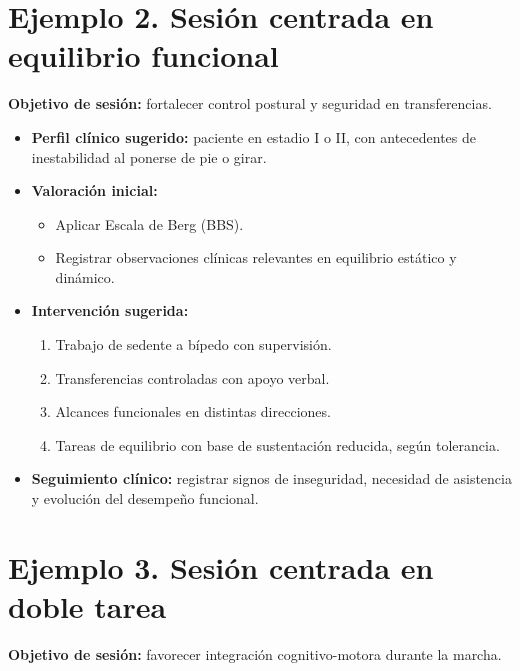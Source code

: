 \documentclass[12pt,a4paper]{article}
\begin{document}
\section{Ejemplo 2. Sesión centrada en equilibrio funcional}

\textbf{Objetivo de sesión:} fortalecer control postural y seguridad en transferencias.

\begin{itemize}
    \item \textbf{Perfil clínico sugerido:} paciente en estadio I o II, con antecedentes de inestabilidad al ponerse de pie o girar.
    \item \textbf{Valoración inicial:}
    \begin{itemize}
        \item Aplicar Escala de Berg (BBS).
        \item Registrar observaciones clínicas relevantes en equilibrio estático y dinámico.
    \end{itemize}
    \item \textbf{Intervención sugerida:}
    \begin{enumerate}
        \item Trabajo de sedente a bípedo con supervisión.
        \item Transferencias controladas con apoyo verbal.
        \item Alcances funcionales en distintas direcciones.
        \item Tareas de equilibrio con base de sustentación reducida, según tolerancia.
    \end{enumerate}
    \item \textbf{Seguimiento clínico:} registrar signos de inseguridad, necesidad de asistencia y evolución del desempeño funcional.
\end{itemize}

\section{Ejemplo 3. Sesión centrada en doble tarea}

\textbf{Objetivo de sesión:} favorecer integración cognitivo-motora durante la marcha.
\end{document}
